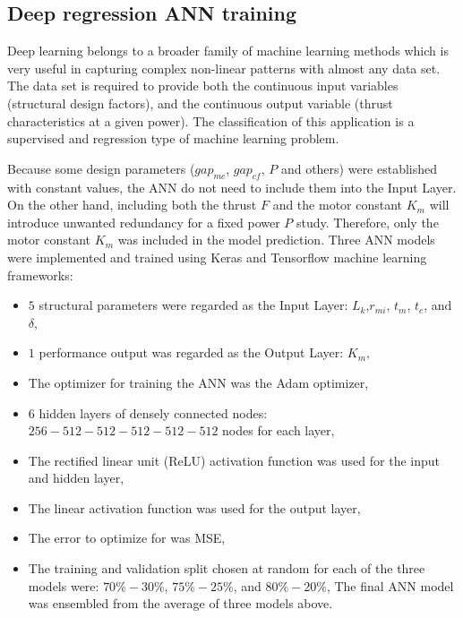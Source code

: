         
        \subsection{Deep regression ANN training}   \label{Chapter:RSM/PMLSM/ANN training}
        
            
            Deep learning belongs to a broader family of machine learning methods which is very useful in capturing complex non-linear patterns with almost any data set. The data set is required to provide both the continuous input variables (structural design factors), and the continuous output variable (thrust characteristics at a given power). The classification of this application is a supervised and regression type of machine learning problem.
            
            
            Because some design parameters ($gap_{mc}$, $gap_{cf}$, $P$ and others) were established with constant values, the \acs{ANN} do not need to include them into the Input Layer. On the other hand, including both the thrust $F$ and the motor constant $K_m$ will introduce unwanted redundancy for a fixed power $P$ study. Therefore, only the motor constant $K_m$ was included in the model prediction. Three \acs{ANN} models were implemented and trained using Keras and Tensorflow machine learning frameworks:
            
            
            \begin{itemize}
                \item $5$ structural parameters were regarded as the Input Layer: $L_k$,$r_{mi}$, $t_m$, $t_c$, and $\delta$,
                \item $1$ performance output was regarded as the Output Layer: $K_m$,
                \item The optimizer for training the \acs{ANN} was the Adam optimizer,
                \item $6$ hidden layers of densely connected nodes: $256-512-512-512-512-512$ nodes for each layer,
                \item The rectified linear unit (ReLU) activation function was used
for the input and hidden layer,
                \item The linear activation function was used for the output layer,
                \item The error to optimize for was \acf{MSE},
                \item The training and validation split chosen at random for each of the three models were: $70\%-30\%$, $75\%-25\%$, and $80\%-20\%$,
                The final \acs{ANN} model was ensembled from the average of three models above.
            \end{itemize}
            
